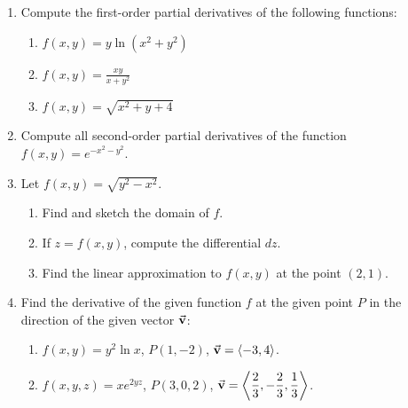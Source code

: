 \documentclass[12pt]{article}
\newcommand{\di}{\displaystyle}
\begin{document}
\begin{enumerate}
\item Compute the first-order partial derivatives of the following functions:
\begin{enumerate}
\item $\di f(x,y) = y\ln(x^2+y^2)$\marginpar{[2]}


\vspace{2in}

\item $\di f(x,y) = \frac{xy}{x+y^2}$\marginpar{[4]}

\vspace{2in}



\item $\di f(x,y) = \sqrt{x^2+y+4}$\marginpar{[4]}

\vspace{2in}
\end{enumerate}
\item Compute all second-order partial derivatives of the function $\di f(x,y) = e^{-x^2-y^2}$.\marginpar{[8]}
\newpage
\item Let $f(x,y) = \sqrt{y^2-x^2}$.
\begin{enumerate}
 \item Find and sketch the domain of $f$.\marginpar{[4]}

\vspace{4in}

 \item If $z=f(x,y)$, compute the differential $dz$. \marginpar{[4]}

\vspace{3in}

 \item Find the linear approximation to $f(x,y)$ at the point $(2,1)$.\marginpar{[4]}

\end{enumerate}
\newpage
\item Find the derivative of the given function $f$ at the given point $P$ in the direction of the given vector $\vec{\bf v}$:
\begin{enumerate}
 \item $\di f(x,y) = y^2\ln x$, $P(1,-2)$, $\di \vec{\bf v} = \left<-3,4\right>$.\marginpar{[5]}

\vspace{2in}
 \item $\di f(x,y,z) = xe^{2yz}$, $P(3,0,2)$, $\di \vec{\bf v} = \left<\frac{2}{3},-\frac{2}{3},\frac{1}{3}\right>$.\marginpar{[5]}


\end{enumerate}
\end{enumerate}
\end{document}
